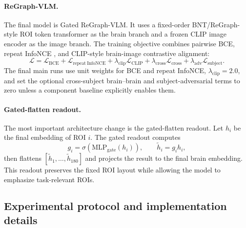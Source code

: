 \documentclass{article}
\begin{document}
\paragraph{ReGraph-VLM.}
The final model is Gated ReGraph-VLM. It uses a fixed-order BNT/ReGraph-style ROI token transformer as the brain branch and a frozen CLIP image encoder \citep{radford2021clip} as the image branch. The training objective combines pairwise BCE, repeat InfoNCE \citep{oord2018infonce}, and CLIP-style brain-image contrastive alignment:
\begin{equation}
  \mathcal{L} =
  \mathcal{L}_{\mathrm{BCE}}
  + \mathcal{L}_{\mathrm{repeat\ InfoNCE}}
  + \lambda_{\mathrm{clip}}\mathcal{L}_{\mathrm{CLIP}}
  + \lambda_{\mathrm{cross}}\mathcal{L}_{\mathrm{cross}}
  + \lambda_{\mathrm{adv}}\mathcal{L}_{\mathrm{subject}}.
\end{equation}
The final main runs use unit weights for BCE and repeat InfoNCE, $\lambda_{\mathrm{clip}}=2.0$, and set the optional cross-subject brain--brain and subject-adversarial terms to zero unless a component baseline explicitly enables them.

\paragraph{Gated-flatten readout.}
The most important architecture change is the gated-flatten readout. Let $h_i$ be the final embedding of ROI $i$. The gated readout computes
\begin{equation}
  g_i = \sigma(\mathrm{MLP}_{\mathrm{gate}}(h_i)), \qquad \tilde{h}_i = g_i h_i,
\end{equation}
then flattens $[\tilde{h}_1,\ldots,\tilde{h}_{180}]$ and projects the result to the final brain embedding. This readout preserves the fixed ROI layout while allowing the model to emphasize task-relevant ROIs.

\subsection{Experimental protocol and implementation details}
\end{document}
